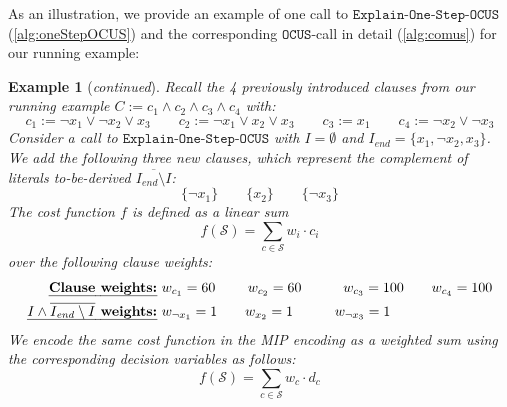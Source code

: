 \documentclass[twoside,11pt]{article}
\newcommand\m[1]{\mathcal{#1}}
\newtheorem{example}{Example}
\newcommand\comment[1]{\marginpar{\tiny #1}}
\renewcommand\comment[1]{#1}
\newcommand{\bart}[1]{{\comment{\color{OliveGreen}Bart: #1}}}
\newcommand\Iend{\ensuremath{I_\mathit{end} }\xspace}
\newcommand\formularunning{\ensuremath{C }\xspace}
\newcommand\mm[1]{\ensuremath{#1}\xspace}
\newcommand\call[1]{\mm{\texttt{#1}}}
\newcommand\comus{\mm{\call{OCUS}}}
\newcommand\onestep{\ensuremath{\call{Explain-One-Step}}\xspace}
\newcommand\onestepo{\ensuremath{\call{Explain-One-Step-OCUS}}\xspace}
\begin{document}
As an illustration, we provide an example of one call to \onestepo (\cref{alg:oneStepOCUS}) and the corresponding \comus-call in detail (\cref{alg:comus}) for our running example:
\begin{example}[\textit{continued}]\label{ex:onestep-ocus}
	Recall the 4 previously introduced clauses from our running example $\formularunning := c_1 \wedge c_2 \wedge c_3 \wedge c_4 $ with:
			\[ c_1 := \lnot x_1 \vee \lnot x_2 \vee x_3 \qquad  c_2 := \lnot x_1 \vee  x_2 \vee x_3 \qquad  c_3 := x_1 \qquad c_4 := \lnot x_2 \vee \lnot x_3 \]
Consider a call to \onestepo with $ I = \emptyset$ and $\Iend = \{x_1, \lnot x_2, x_3\}$. We add the following three new clauses, which represent the complement of literals to-be-derived $\overline{\Iend\setminus I}$:
\[ \{\lnot x_1\}\qquad  \{x_2\} \qquad\{\lnot x_3\}\]
The cost function $f$ is defined as a linear sum  
\begin{equation}
	f(\m{S}) = \sum_{c \in \m{S}} w_i\cdot c_i
\end{equation} over the following clause weights:
\begin{align*}
	\text{\textbf{\emph{Clause weights:}}} & \ w_{c_1} = 60 \  \qquad w_{c_2}=60  \qquad  \ \ \ w_{c_3}=100 \qquad w_{c_4}=100 \\
	\text{\textbf{\emph{$I \wedge \overline{\Iend \setminus I}$ weights:}}} & \  w_{\lnot x_1}=1  \qquad w_{ x_2}=1 \ \ \ \qquad w_{\lnot x_3}=1 
\end{align*}
We encode the same cost function in the MIP encoding as a weighted sum using the corresponding decision variables as follows:
\begin{equation}
	f(\m{S}) = \sum_{c \in \m{S}} w_c\cdot d_{c} 
\end{equation}

\end{example}
\end{document}
